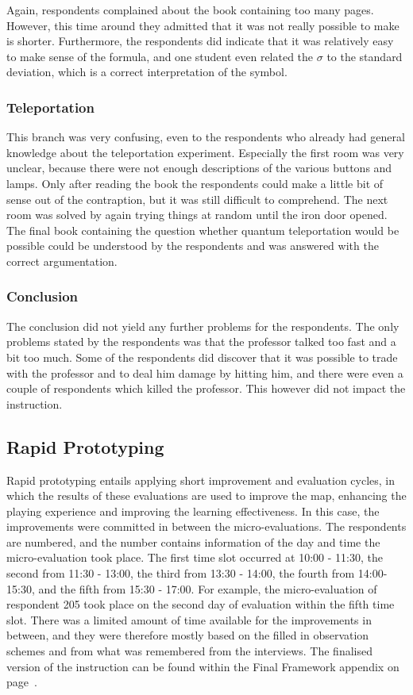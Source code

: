 \documentclass[11pt,twoside]{report} %
\begin{document}
Again, respondents complained about the book containing too many pages. However, this time around they admitted that it was not really possible to make is shorter. Furthermore, the respondents did indicate that it was relatively easy to make sense of the formula, and one student even related the $\sigma$ to the standard deviation, which is a correct interpretation of the symbol.

\subsubsection{Teleportation}

This branch was very confusing, even to the respondents who already had general knowledge about the teleportation experiment. Especially the first room was very unclear, because there were not enough descriptions of the various buttons and lamps. Only after reading the book the respondents could make a little bit of sense out of the contraption, but it was still difficult to comprehend. The next room was solved by again trying things at random until the iron door opened. The final book containing the question whether quantum teleportation would be possible could be understood by the respondents and was answered with the correct argumentation.

\subsubsection{Conclusion}

The conclusion did not yield any further problems for the respondents. The only problems stated by the respondents was that the professor talked too fast and a bit too much. Some of the respondents did discover that it was possible to trade with the professor and to deal him damage by hitting him, and there were even a couple of respondents which killed the professor. This however did not impact the instruction.

\subsection{Rapid Prototyping}

Rapid prototyping entails applying short improvement and evaluation cycles, in which the results of these evaluations are used to improve the map, enhancing the playing experience and improving the learning effectiveness. In this case, the improvements were committed in between the micro-evaluations. The respondents are numbered, and the number contains information of the day and time the micro-evaluation took place. The first time slot occurred at 10:00 - 11:30, the second from 11:30 - 13:00, the third from 13:30 - 14:00, the fourth from 14:00-15:30, and the fifth from 15:30 - 17:00. For example, the micro-evaluation of respondent 205 took place on the second day of evaluation within the fifth time slot. There was a limited amount of time available for the improvements in between, and they were therefore mostly based on the filled in observation schemes and from what was remembered from the interviews. The finalised version of the instruction can be found within the Final Framework appendix on page~\pageref{framework2}.
\end{document}
